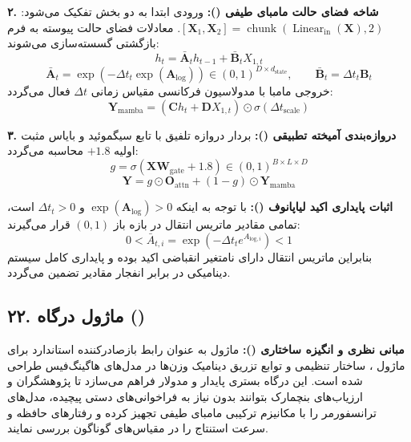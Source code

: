 \textbf{۲. شاخه فضای حالت مامبای طیفی ():}
ورودی ابتدا به دو بخش تفکیک می‌شود: $[\mathbf{X}_1, \mathbf{X}_2] = \operatorname{chunk}(\operatorname{Linear}_{\text{in}}(\mathbf{X}), 2)$.
معادلات فضای حالت پیوسته به فرم بازگشتی گسسته‌سازی می‌شوند:
\begin{equation}
h_t = \bar{\mathbf{A}}_t h_{t-1} + \bar{\mathbf{B}}_t X_{1, t}
\end{equation}
\begin{equation}
\bar{\mathbf{A}}_t = \exp(-\Delta t_t \exp(\mathbf{A}_{\text{log}})) \in (0, 1)^{D \times d_{\text{state}}}, \qquad \bar{\mathbf{B}}_t = \Delta t_t \mathbf{B}_t
\end{equation}
خروجی مامبا با مدولاسیون فرکانسی مقیاس زمانی $\Delta t$ فعال می‌گردد:
\begin{equation}
\mathbf{Y}_{\text{mamba}} = (\mathbf{C} h_t + \mathbf{D} X_{1, t}) \odot \sigma(\Delta t_{\text{scale}})
\end{equation}

\textbf{۳. دروازه‌بندی آمیخته تطبیقی ():}
بردار دروازه تلفیق با تابع سیگموئید و بایاس مثبت اولیه $+1.8$ محاسبه می‌گردد:
\begin{equation}
g = \sigma(\mathbf{X} \mathbf{W}_{\text{gate}} + 1.8) \in (0, 1)^{B \times L \times D}
\end{equation}
\begin{equation}
\mathbf{Y} = g \odot \mathbf{O}_{\text{attn}} + (1 - g) \odot \mathbf{Y}_{\text{mamba}}
\end{equation}

\textbf{اثبات پایداری اکید لیاپانوف ():}
با توجه به اینکه $\exp(\mathbf{A}_{\text{log}}) > 0$ و $\Delta t_t > 0$ است، تمامی مقادیر ماتریس انتقال در بازه باز $(0, 1)$ قرار می‌گیرند:
\begin{equation}
0 < \bar{A}_{t, i} = \exp(-\Delta t_t e^{A_{\text{log}, i}}) < 1
\end{equation}
بنابراین ماتریس انتقال دارای نامتغیر انقباضی اکید بوده و پایداری کامل سیستم دینامیکی در برابر انفجار مقادیر تضمین می‌گردد.



\subsection*{۲۲. ماژول درگاه  ()}

\textbf{مبانی نظری و انگیزه ساختاری ():}
ماژول  به عنوان رابط بازصادرکننده استاندارد برای ماژول ، ساختار تنظیمی  و توابع تزریق دینامیک وزن‌ها در مدل‌های هاگینگ‌فیس طراحی شده است.
این درگاه بستری پایدار و مدولار فراهم می‌سازد تا پژوهشگران و ارزیاب‌های بنچمارک بتوانند بدون نیاز به فراخوانی‌های دستی پیچیده، مدل‌های ترانسفورمر را با مکانیزم ترکیبی مامبای طیفی تجهیز کرده و رفتارهای حافظه و سرعت استنتاج را در مقیاس‌های گوناگون بررسی نمایند.



